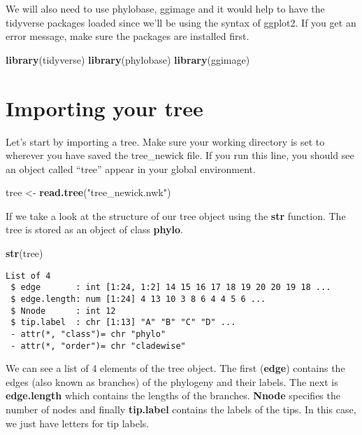 \documentclass[]{book}
\newenvironment{Shaded}{\begin{snugshade}}{\end{snugshade}}
\newcommand{\KeywordTok}[1]{\textcolor[rgb]{0.13,0.29,0.53}{\textbf{#1}}}
\newcommand{\StringTok}[1]{\textcolor[rgb]{0.31,0.60,0.02}{#1}}
\newcommand{\NormalTok}[1]{#1}
\begin{document}
We will also need to use phylobase, ggimage and it would help to have
the tidyverse packages loaded since we'll be using the syntax of
ggplot2. If you get an error message, make sure the packages are
installed first.

\begin{Shaded}
\begin{Highlighting}[]
\KeywordTok{library}\NormalTok{(tidyverse)}
\KeywordTok{library}\NormalTok{(phylobase)}
\KeywordTok{library}\NormalTok{(ggimage)}
\end{Highlighting}
\end{Shaded}

\section{Importing your tree}\label{importing-your-tree}

Let's start by importing a tree. Make sure your working directory is set
to wherever you have saved the tree\_newick file. If you run this line,
you should see an object called ``tree'' appear in your global
environment.

\begin{Shaded}
\begin{Highlighting}[]
\NormalTok{tree <-}\StringTok{ }\KeywordTok{read.tree}\NormalTok{(}\StringTok{"tree_newick.nwk"}\NormalTok{)}
\end{Highlighting}
\end{Shaded}

If we take a look at the structure of our tree object using the
\textbf{str} function. The tree is stored as an object of class
\textbf{phylo}.

\begin{Shaded}
\begin{Highlighting}[]
\KeywordTok{str}\NormalTok{(tree)}
\end{Highlighting}
\end{Shaded}

\begin{verbatim}
List of 4
 $ edge       : int [1:24, 1:2] 14 15 16 17 18 19 20 20 19 18 ...
 $ edge.length: num [1:24] 4 13 10 3 8 6 4 4 5 6 ...
 $ Nnode      : int 12
 $ tip.label  : chr [1:13] "A" "B" "C" "D" ...
 - attr(*, "class")= chr "phylo"
 - attr(*, "order")= chr "cladewise"
\end{verbatim}

We can see a list of 4 elements of the tree object. The first
(\textbf{edge}) contains the edges (also known as branches) of the
phylogeny and their labels. The next is \textbf{edge.length} which
contains the lengths of the branches. \textbf{Nnode} specifies the
number of nodes and finally \textbf{tip.label} contains the labels of
the tips. In this case, we just have letters for tip labels.
\end{document}
